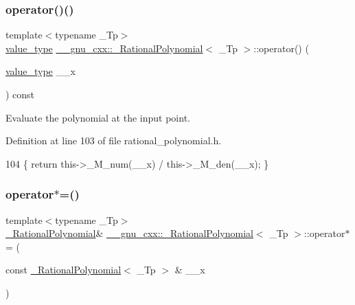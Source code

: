 \subsubsection{\texorpdfstring{operator()()}{operator()()}}
{\footnotesize\ttfamily template$<$typename \+\_\+\+Tp$>$ \\
\hyperlink{class____gnu__cxx_1_1__RationalPolynomial_adeec7f1bec03111031599f337848ee8b}{value\+\_\+type} \hyperlink{class____gnu__cxx_1_1__RationalPolynomial}{\+\_\+\+\_\+gnu\+\_\+cxx\+::\+\_\+\+Rational\+Polynomial}$<$ \+\_\+\+Tp $>$\+::operator() (\begin{DoxyParamCaption}\item[{\hyperlink{class____gnu__cxx_1_1__RationalPolynomial_adeec7f1bec03111031599f337848ee8b}{value\+\_\+type}}]{\+\_\+\+\_\+x }\end{DoxyParamCaption}) const\hspace{0.3cm}{\ttfamily [inline]}}

Evaluate the polynomial at the input point. 

Definition at line 103 of file rational\+\_\+polynomial.\+h.


\begin{DoxyCode}
104       \{ \textcolor{keywordflow}{return} this->\_M\_num(\_\_x) / this->\_M\_den(\_\_x); \}
\end{DoxyCode}
\mbox{\label{class____gnu__cxx_1_1__RationalPolynomial_a3905ba0616e848fb7daa18dd01481b78}} 
\subsubsection{\texorpdfstring{operator$\ast$=()}{operator*=()}}
{\footnotesize\ttfamily template$<$typename \+\_\+\+Tp$>$ \\
\hyperlink{class____gnu__cxx_1_1__RationalPolynomial}{\+\_\+\+Rational\+Polynomial}\& \hyperlink{class____gnu__cxx_1_1__RationalPolynomial}{\+\_\+\+\_\+gnu\+\_\+cxx\+::\+\_\+\+Rational\+Polynomial}$<$ \+\_\+\+Tp $>$\+::operator$\ast$= (\begin{DoxyParamCaption}\item[{const \hyperlink{class____gnu__cxx_1_1__RationalPolynomial}{\+\_\+\+Rational\+Polynomial}$<$ \+\_\+\+Tp $>$ \&}]{\+\_\+\+\_\+x }\end{DoxyParamCaption})\hspace{0.3cm}{\ttfamily [inline]}}

